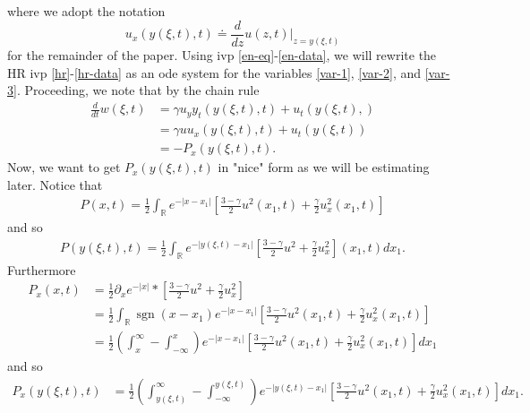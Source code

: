 \documentclass[12pt,reqno]{amsart}
\numberwithin{equation}{section}  %
\numberwithin{figure}{section}
\DeclareMathOperator{\sgn}{sgn}
\newcommand{\rr}{\mathbb{R}}
\newcommand{\p}{\partial}
\begin{document}
where we adopt the notation $$u_{x}(y(\xi, t),t) \doteq \frac{d}{dz}u(z,t) \big
|_{z = y(\xi, t)}$$ for the remainder of the paper. Using ivp
\eqref{en-eq}-\eqref{en-data}, we will rewrite the HR ivp
\eqref{hr}-\eqref{hr-data} as an ode system for the variables \eqref{var-1},
\eqref{var-2}, and \eqref{var-3}. Proceeding, we note that by the chain rule
%
%
\begin{equation}
\label{w-deriv}
\begin{split}
\frac{d}{dt}w(\xi, t)
& = \gamma u_{y} y_{t}(y(\xi, t), t) + u_{t}(y(\xi, t), )
\\
& = \gamma u u_{x}(y(\xi, t ), t) + u_{t}(y(\xi, t))
\\
& = -P_{x}(y(\xi, t), t).
\end{split}
\end{equation}
%
%
Now, we want to get $P_{x}(y(\xi, t), t)$ in "nice" form as we will be estimating later. Notice that
%
%
\begin{equation*}
\begin{split}
P(x,t) = \frac{1}{2} \int_{\rr}e^{-| x - x_{1} |} \left [\frac{3 - \gamma}{2}
u^{2}(x_{1}, t) + \frac{\gamma}{2} u_{x}^{2}(x_{1}, t) \right ]
\end{split}
\end{equation*}
%
%
and so 
%
%
\begin{equation}
\label{yuu}
\begin{split}
P(y(\xi, t), t) = \frac{1}{2} \int_{\rr} e^{-| y(\xi, t) - x_{1} |} \left [ \frac{3 - \gamma}{2} u^{2} + \frac{\gamma}{2}u_{x}^{2} \right ] (x_{1}, t) d x_{1}.
\end{split}
\end{equation}
%
%
Furthermore
%
%
\begin{equation}
\begin{split}
\label{p}
P_{x}(x,t)
& = \frac{1}{2}\p_{x} e^{-| x |}* \left [ \frac{3 - \gamma}{2} u^{2} + \frac{\gamma}{2} u_{x}^{2} \right ] 
\\
& = \frac{1}{2} \int_{\rr} \sgn(x - x_{1}) e^{-| x - x_{1} |} \left [ \frac{3 - \gamma}{2} u^{2}(x_{1}, t) + \frac{\gamma}{2} u_{x}^{2}(x_{1}, t) \right ] 
\\
& =\frac{1}{2} \left ( \int_{x}^{\infty} - \int_{-\infty}^{x} \right )
e^{-| x - x_{1} |} \left [ \frac{3 - \gamma}{2} u^{2}(x_{1}, t) +
\frac{\gamma}{2} u_{x}^{2}(x_{1}, t) \right ] dx_{1}
\end{split}
\end{equation}
%
%
and so%
%
\begin{equation}
\label{p-deriv}
\begin{split}
P_{x}(y(\xi, t), t)
& = \frac{1}{2} \left ( \int_{y(\xi, t)}^{\infty} - \int_{-\infty}^{y(\xi, t)} \right ) e^{-| y(\xi, t) - x_{1} |} \left [ \frac{3 - \gamma}{2} u^{2}(x_{1}, t) +
\frac{\gamma}{2} u_{x}^{2}(x_{1}, t) \right ] dx_{1}.
\end{split}
\end{equation}
\end{document}
